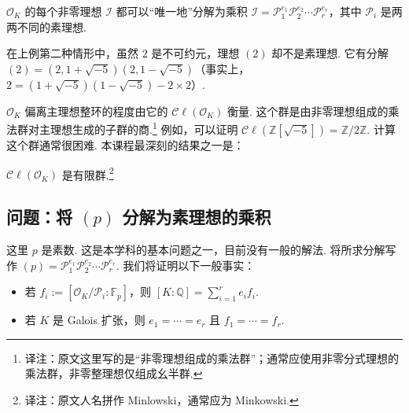 \begin{theorem*}

$\mathcal O_K$ 的每个非零理想 $\mathcal I$ 都可以``唯一地''分解为乘积 $\mathcal I=\mathcal P_1^{e_1}\mathcal P_2^{e_2}\cdots\mathcal P_r^{e_r}$，其中 $\mathcal P_i$ 是两两不同的素理想.

\end{theorem*}

\begin{example*}

在上例第二种情形中，虽然 $2$ 是不可约元，理想 $(2)$ 却不是素理想. 它有分解 $(2)=(2,1+\sqrt{-5})(2,1-\sqrt{-5})$（事实上，$2=(1+\sqrt{-5})(1-\sqrt{-5})-2\times2$）.

\end{example*}

$\mathcal O_K$ 偏离主理想整环的程度由它的 $\mathcal C\ell(\mathcal O_K)$ 衡量. 这个群是由非零理想组成的乘法群对主理想生成的子群的商.\footnote{译注：原文这里写的是``非零理想组成的乘法群''；通常应使用非零分式理想的乘法群，非零整理想仅组成幺半群.} 例如，可以证明 $\mathcal C\ell(\mathbb{Z}[\sqrt{-5}])=\mathbb{Z}/2\mathbb{Z}$. 计算这个群通常很困难. 本课程最深刻的结果之一是：

\begin{theorem*}

$\mathcal C\ell(\mathcal O_K)$ 是有限群.\footnote{译注：原文人名拼作 Minlowski，通常应为 Minkowski.}

\end{theorem*}

\subsection{问题：将 $(p)$ 分解为素理想的乘积}\label{sec:nt-1-2-4}

这里 $p$ 是素数. 这是本学科的基本问题之一，目前没有一般的解法. 将所求分解写作 $(p)=\mathcal P_1^{e_1}\mathcal P_2^{e_2}\cdots\mathcal P_r^{e_r}$. 我们将证明以下一般事实：

\begin{itemize}

\item 若 $f_i:=[\mathcal O_K/\mathcal P_i:\mathbb{F}_p]$，则 $[K:\mathbb{Q}]=\sum_{i=1}^re_if_i$.

\item 若 $K$ 是 Galois 扩张，则 $e_1=\cdots=e_r$ 且 $f_1=\cdots=f_r$.

\end{itemize}

